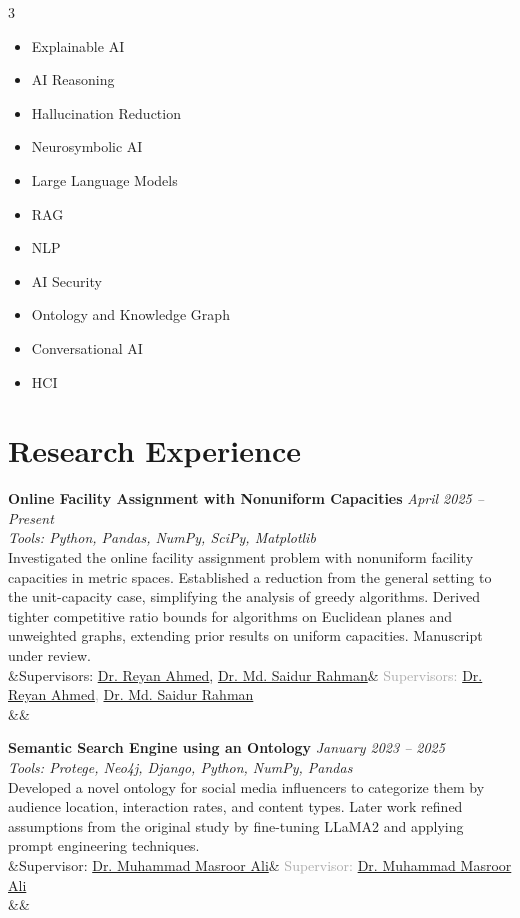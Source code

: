 \documentclass[a4paper,9pt]{article}
\newcommand{\cvresearch}[6]{%
    \textbf{#1} \hfill \textit{#2}\\
    \textit{Tools: #3}\\
    \vspace{0pt}
    #4\\
    \ifx&#5&%
    \else
        \textcolor{darkgray}{#5}\\
    \fi
    \ifx&#6&%
    \else
        #6\\
    \fi
    \vspace{2pt}
}
\begin{document}
\begin{multicols}{3}
\begin{itemize}[leftmargin=12pt, itemsep=0pt, parsep=0pt, topsep=0pt]
    \item Explainable AI
    \item AI Reasoning
    \item Hallucination Reduction
    \item Neurosymbolic AI
    \item Large Language Models
    \item RAG
    \item NLP
    \item AI Security
    \item Ontology and Knowledge Graph
    \item Conversational AI
    \item HCI
\end{itemize}
\end{multicols}

\section{Research Experience}

\cvresearch
{Online Facility Assignment with Nonuniform Capacities}
{April 2025 -- Present}
{Python, Pandas, NumPy, SciPy, Matplotlib}
{Investigated the online facility assignment problem with nonuniform facility capacities in metric spaces. Established a reduction from the general setting to the unit-capacity case, simplifying the analysis of greedy algorithms. Derived tighter competitive ratio bounds for algorithms on Euclidean planes and unweighted graphs, extending prior results on uniform capacities. Manuscript under review.}
{Supervisors: \href{https://www.cs.arizona.edu/person/reyan-ahmed}{Dr. Reyan Ahmed}, \href{https://cse.buet.ac.bd/faculty/faculty_detail/saidurrahman}{Dr. Md. Saidur Rahman}}
{}

\cvresearch
{Semantic Search Engine using an Ontology}
{January 2023 -- 2025}
{Protege, Neo4j, Django, Python, NumPy, Pandas}
{Developed a novel ontology for social media influencers to categorize them by audience location, interaction rates, and content types. Later work refined assumptions from the original study by fine-tuning LLaMA2 and applying prompt engineering techniques.}
{Supervisor: \href{https://cse.buet.ac.bd/faculty/faculty_detail/mmasroorali}{Dr. Muhammad Masroor Ali}}
{}
\end{document}
